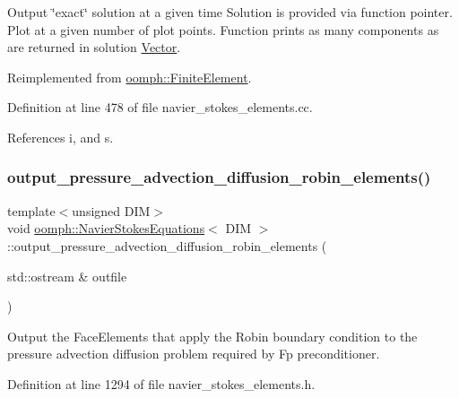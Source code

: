 Output \char`\"{}exact\char`\"{} solution at a given time Solution is provided via function pointer. Plot at a given number of plot points. Function prints as many components as are returned in solution \hyperlink{classoomph_1_1Vector}{Vector}. 

Reimplemented from \hyperlink{classoomph_1_1FiniteElement_a2a8426dccd57b927be0ae0eec00d0479}{oomph\+::\+Finite\+Element}.



Definition at line 478 of file navier\+\_\+stokes\+\_\+elements.\+cc.



References i, and s.

\mbox{\label{classoomph_1_1NavierStokesEquations_aaa8d3ae0aee457dc96e028583d793652}} 
\subsubsection{\texorpdfstring{output\+\_\+pressure\+\_\+advection\+\_\+diffusion\+\_\+robin\+\_\+elements()}{output\_pressure\_advection\_diffusion\_robin\_elements()}}
{\footnotesize\ttfamily template$<$unsigned D\+IM$>$ \\
void \hyperlink{classoomph_1_1NavierStokesEquations}{oomph\+::\+Navier\+Stokes\+Equations}$<$ D\+IM $>$\+::output\+\_\+pressure\+\_\+advection\+\_\+diffusion\+\_\+robin\+\_\+elements (\begin{DoxyParamCaption}\item[{std\+::ostream \&}]{outfile }\end{DoxyParamCaption})\hspace{0.3cm}{\ttfamily [inline]}}



Output the Face\+Elements that apply the Robin boundary condition to the pressure advection diffusion problem required by Fp preconditioner. 



Definition at line 1294 of file navier\+\_\+stokes\+\_\+elements.\+h.



